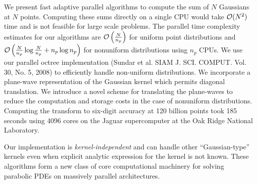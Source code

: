 We present fast adaptive parallel algorithms to compute the sum of $N$ Gaussians at $N$ points. 
Computing these sums directly on a single CPU would take $\mathcal{O}(N^2)$ time and is not feasible
for large scale problems. The parallel time complexity estimates for our algorithms are $ \mathcal{O} \left(\frac{N}{n_p} \right)$ 
for uniform point distributions and $ \mathcal{O}\left(\frac{N}{n_p}\log \frac{N}{n_p} + n_p \log n_p\right)$ 
for nonuniform distributions using $n_p$ CPUs. We use our parallel octree implementation (Sundar et al. 
SIAM J. SCI. COMPUT. Vol. 30, No. 5, 2008) to efficiently handle non-uniform distributions. We incorporate
 a plane-wave representation of the Gaussian kernel which permits diagonal translation. We introduce a 
 novel scheme for translating the plane-waves to reduce the computation and storage costs in the case of 
 nonuniform distributions. Computing the transform to six-digit accuracy at 120 billion points took
 185 seconds using 4096 cores on the Jaguar supercomputer at the Oak Ridge National Laboratory. 

Our implementation is {\em kernel-independent} and can handle other ``Gaussian-type'' kernels even
 when explicit analytic expression for the kernel is not known. These algorithms form a new class of core computational machinery for solving parabolic PDEs on massively parallel architectures. 